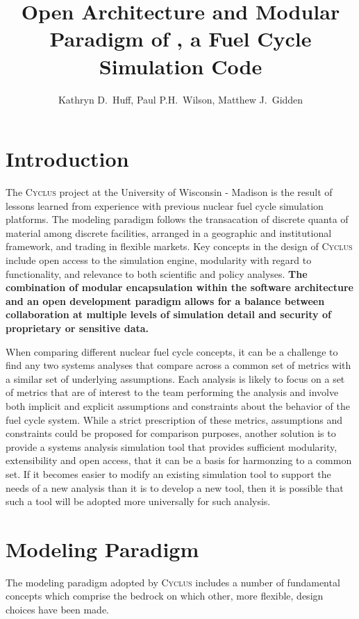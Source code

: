 \documentclass{anstrans}
\title{Open Architecture and Modular Paradigm of \Cyclus, a Fuel Cycle Simulation Code}
\author{Kathryn D.~Huff, Paul P.H.~Wilson, Matthew J.~Gidden}
\institute{Department of Nuclear Engineering \& Engineering Physics, University of Wisconsin, Madison, WI, 53706}
\date{}
\newcommand{\Cyclus}{\textsc{Cyclus }}
\begin{document}
\section{Introduction}

The \Cyclus project at the University of Wisconsin - Madison is the
result of lessons learned from experience with previous nuclear fuel
cycle simulation platforms. The modeling paradigm follows the
transacation of discrete quanta of material among discrete facilities,
arranged in a geographic and institutional framework, and trading in
flexible markets. Key concepts in the design of \Cyclus include open
access to the simulation engine, modularity with regard to
functionality, and relevance to both scientific and policy
analyses. \textbf{The combination of modular encapsulation within the
  software architecture and an open development paradigm allows for a
  balance between collaboration at multiple levels of simulation
  detail and security of proprietary or sensitive data.}


When comparing different nuclear fuel cycle concepts, it can be a
challenge to find any two systems analyses that compare across a
common set of metrics with a similar set of underlying assumptions.
Each analysis is likely to focus on a set of metrics that are of
interest to the team performing the analysis and involve both implicit
and explicit assumptions and constraints about the behavior of the
fuel cycle system.  While a strict prescription of these metrics,
assumptions and constraints could be proposed for comparison purposes,
another solution is to provide a systems analysis simulation tool that
provides sufficient modularity, extensibility and open access, that it
can be a basis for harmonzing to a common set.  If it becomes easier
to modify an existing simulation tool to support the needs of a new
analysis than it is to develop a new tool, then it is possible that
such a tool will be adopted more universally for such analysis.

\section{Modeling Paradigm}

The modeling paradigm adopted by \Cyclus includes a number of
fundamental concepts which comprise the bedrock on which other, more
flexible, design choices have been made. 
\end{document}
